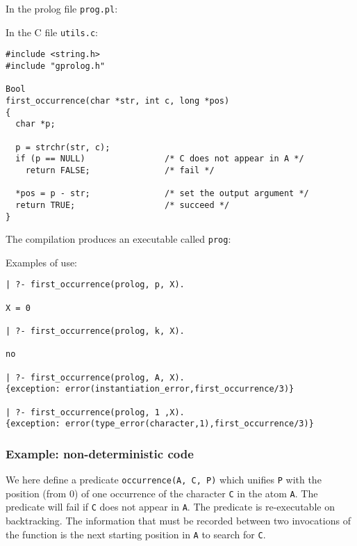 In the prolog file \texttt{prog.pl}:


In the C file \texttt{utils.c}:

\begin{Indentation}
\begin{verbatim}
#include <string.h>
#include "gprolog.h"

Bool
first_occurrence(char *str, int c, long *pos)
{
  char *p;

  p = strchr(str, c);
  if (p == NULL)                /* C does not appear in A */
    return FALSE;               /* fail */

  *pos = p - str;               /* set the output argument */
  return TRUE;                  /* succeed */
}
\end{verbatim}
\end{Indentation}

The compilation produces an executable called \texttt{prog}:


Examples of use:

\begin{Indentation}
\begin{verbatim}
| ?- first_occurrence(prolog, p, X).

X = 0

| ?- first_occurrence(prolog, k, X).

no

| ?- first_occurrence(prolog, A, X).
{exception: error(instantiation_error,first_occurrence/3)}

| ?- first_occurrence(prolog, 1 ,X).
{exception: error(type_error(character,1),first_occurrence/3)}
\end{verbatim}
\end{Indentation}

\subsubsection{Example: non-deterministic code}
We here define a predicate \texttt{occurrence(A, C, P)} which unifies
\texttt{P} with the position (from 0) of one occurrence of the character
\texttt{C} in the atom \texttt{A}. The predicate will fail if \texttt{C}
does not appear in \texttt{A}. The predicate is re-executable on
backtracking. The information that must be recorded between two invocations
of the function is the next starting position in \texttt{A} to search for
\texttt{C}.

